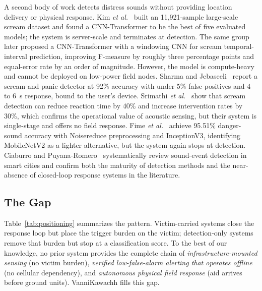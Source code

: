 \documentclass[journal]{IEEEtran}
\begin{document}
A second body of work detects distress sounds without providing location
delivery or physical response. Kim \emph{et al.}~\cite{kim2024} built an
11,921-sample large-scale scream dataset and found a CNN-Transformer to be
the best of five evaluated models; the system is server-scale and terminates
at detection. The same group~\cite{kim2025} later proposed a CNN-Transformer
with a windowing CNN for scream temporal-interval prediction, improving
F-measure by roughly three percentage points and equal-error rate by an
order of magnitude. However, the model is compute-heavy and cannot be
deployed on low-power field nodes. Sharma and Jebaseeli~\cite{sharma2025}
report a scream-and-panic detector at 92\% accuracy with under 5\% false
positives and 4 to 6~s response, bound to the user's device. Srimathi
\emph{et al.}~\cite{srimathi2025} show that scream detection can reduce
reaction time by 40\% and increase intervention rates by 30\%, which
confirms the operational value of acoustic sensing, but their system is
single-stage and offers no field response. Fime \emph{et
al.}~\cite{fime2024} achieve 95.51\% danger-sound accuracy with Noisereduce
preprocessing and InceptionV3, identifying MobileNetV2 as a lighter
alternative, but the system again stops at detection.
Ciaburro and Puyana-Romero~\cite{ciaburro2026} systematically review
sound-event detection in smart cities and confirm both the maturity of
detection methods and the near-absence of closed-loop response systems in
the literature.

\subsection{The Gap}

Table~\ref{tab:positioning} summarizes the pattern. Victim-carried systems
close the response loop but place the trigger burden on the victim;
detection-only systems remove that burden but stop at a classification
score. To the best of our knowledge, no prior system provides the complete
chain of \emph{infrastructure-mounted sensing} (no victim burden),
\emph{verified low-false-alarm alerting that operates offline} (no cellular
dependency), and \emph{autonomous physical field response} (aid arrives
before ground units). VanniKawachh fills this gap.
\end{document}
